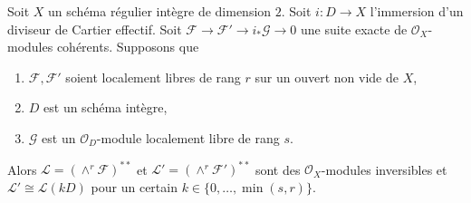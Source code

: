 \begin{lemma}
\label{lemma-wedge-product-ses}
Soit  $X$  un schéma régulier intègre de dimension  $2$. Soit
 $i : D \to X$  l'immersion d'un diviseur de Cartier effectif. Soit  $\mathcal{F} \to \mathcal{F}' \to i_*\mathcal{G} \to 0$  une
suite exacte de  $\mathcal{O}_X$-modules cohérents. Supposons que
\begin{enumerate}
\item $\mathcal{F}, \mathcal{F}'$  soient localement libres de rang  $r$  sur un ouvert non vide
de  $X$,
\item $D$  est un schéma intègre,
\item $\mathcal{G}$  est un  $\mathcal{O}_D$-module localement libre de rang
 $s$.
\end{enumerate}
Alors  $\mathcal{L} = (\wedge^r\mathcal{F})^{**}$  et  $\mathcal{L}' = (\wedge^r \mathcal{F}')^{**}$  sont des  $\mathcal{O}_X$-modules inversibles et
 $\mathcal{L}' \cong \mathcal{L}(k D)$  pour un certain  $k \in \{0, \ldots, \min(s, r)\}$.
\end{lemma}

